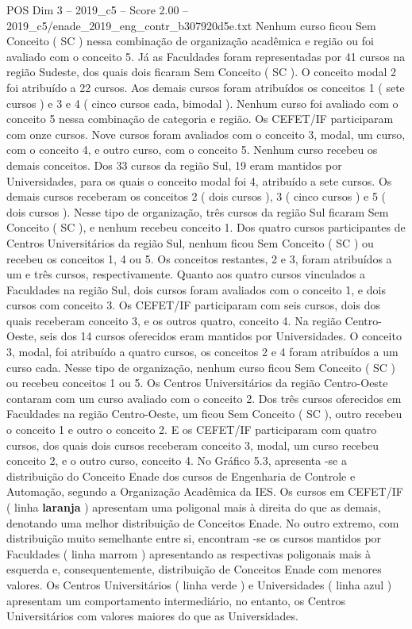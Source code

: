 \begin{textsample}{POS Dim 3 – 2019\_c5 – Score 2.00 – 2019\_c5/enade\_2019\_eng\_contr\_b307920d5e.txt}
Nenhum curso ficou Sem Conceito ( SC ) nessa combinação de organização acadêmica e região ou foi avaliado com o conceito 5.
Já as Faculdades foram representadas por 41 cursos na região Sudeste, dos quais dois ficaram Sem Conceito ( SC ).
O conceito modal 2 foi atribuído a 22 cursos.
Aos demais cursos foram atribuídos os conceitos 1 ( sete cursos ) e 3 e 4 ( cinco cursos cada, bimodal ).
Nenhum curso foi avaliado com o conceito 5 nessa combinação de categoria e região.
Os CEFET/IF participaram com onze cursos.
Nove cursos foram avaliados com o conceito 3, modal, um curso, com o conceito 4, e outro curso, com o conceito 5.
Nenhum curso recebeu os demais conceitos.
Dos 33 cursos da região Sul, 19 eram mantidos por Universidades, para os quais o conceito modal foi 4, atribuído a sete cursos.
Os demais cursos receberam os conceitos 2 ( dois cursos ), 3 ( cinco cursos ) e 5 ( dois cursos ).
Nesse tipo de organização, três cursos da região Sul ficaram Sem Conceito ( SC ), e nenhum recebeu conceito 1.
Dos quatro cursos participantes de Centros Universitários da região Sul, nenhum ficou Sem Conceito ( SC ) ou recebeu os conceitos 1, 4 ou 5.
Os conceitos restantes, 2 e 3, foram atribuídos a um e três cursos, respectivamente.
Quanto aos quatro cursos vinculados a Faculdades na região Sul, dois cursos foram avaliados com o conceito 1, e dois cursos com conceito 3.
Os CEFET/IF participaram com seis cursos, dois dos quais receberam conceito 3, e os outros quatro, conceito 4.
Na região Centro-Oeste, seis dos 14 cursos oferecidos eram mantidos por Universidades.
O conceito 3, modal, foi atribuído a quatro cursos, os conceitos 2 e 4 foram atribuídos a um curso cada.
Nesse tipo de organização, nenhum curso ficou Sem Conceito ( SC ) ou recebeu conceitos 1 ou 5.
Os Centros Universitários da região Centro-Oeste contaram com um curso avaliado com o conceito 2.
Dos três cursos oferecidos em Faculdades na região Centro-Oeste, um ficou Sem Conceito ( SC ), outro recebeu o conceito 1 e outro o conceito 2.
E os CEFET/IF participaram com quatro cursos, dos quais dois cursos receberam conceito 3, modal, um curso recebeu conceito 2, e o outro curso, conceito 4.
No Gráfico 5.3, apresenta -se a distribuição do Conceito Enade dos cursos de Engenharia de Controle e Automação, segundo a Organização Acadêmica da IES.
Os cursos em CEFET/IF ( linha \textbf{laranja} ) apresentam uma poligonal mais à direita do que as demais, denotando uma melhor distribuição de Conceitos Enade.
No outro extremo, com distribuição muito semelhante entre si, encontram -se os cursos mantidos por Faculdades ( linha marrom ) apresentando as respectivas poligonais mais à esquerda e, consequentemente, distribuição de Conceitos Enade com menores valores.
Os Centros Universitários ( linha verde ) e Universidades ( linha azul ) apresentam um comportamento intermediário, no entanto, os Centros Universitários com valores maiores do que as Universidades.

\end{textsample}
